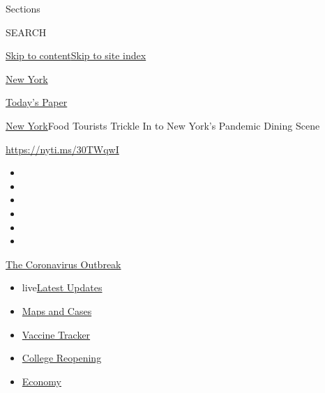 Sections

SEARCH

\protect\hyperlink{site-content}{Skip to
content}\protect\hyperlink{site-index}{Skip to site index}

\href{https://www.nytimes.com/section/nyregion}{New York}

\href{https://myaccount.nytimes.com/auth/login?response_type=cookie\&client_id=vi}{}

\href{https://www.nytimes.com/section/todayspaper}{Today's Paper}

\href{/section/nyregion}{New York}\textbar{}Food Tourists Trickle In to
New York's Pandemic Dining Scene

\url{https://nyti.ms/30TWqwI}

\begin{itemize}
\item
\item
\item
\item
\item
\item
\end{itemize}

\href{https://www.nytimes.com/news-event/coronavirus?action=click\&pgtype=Article\&state=default\&region=TOP_BANNER\&context=storylines_menu}{The
Coronavirus Outbreak}

\begin{itemize}
\tightlist
\item
  live\href{https://www.nytimes.com/2020/08/04/world/coronavirus-cases.html?action=click\&pgtype=Article\&state=default\&region=TOP_BANNER\&context=storylines_menu}{Latest
  Updates}
\item
  \href{https://www.nytimes.com/interactive/2020/us/coronavirus-us-cases.html?action=click\&pgtype=Article\&state=default\&region=TOP_BANNER\&context=storylines_menu}{Maps
  and Cases}
\item
  \href{https://www.nytimes.com/interactive/2020/science/coronavirus-vaccine-tracker.html?action=click\&pgtype=Article\&state=default\&region=TOP_BANNER\&context=storylines_menu}{Vaccine
  Tracker}
\item
  \href{https://www.nytimes.com/2020/08/02/us/covid-college-reopening.html?action=click\&pgtype=Article\&state=default\&region=TOP_BANNER\&context=storylines_menu}{College
  Reopening}
\item
  \href{https://www.nytimes.com/live/2020/08/04/business/stock-market-today-coronavirus?action=click\&pgtype=Article\&state=default\&region=TOP_BANNER\&context=storylines_menu}{Economy}
\end{itemize}

